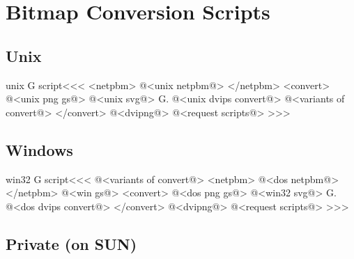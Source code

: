 \documentclass{article}
\begin{document}
\section{Bitmap Conversion Scripts}



\subsection{Unix}




\<unix G script\><<<
<netpbm>
@<unix netpbm@>
</netpbm>
<convert>
@<unix png gs@>
@<unix svg@>
G.
@<unix dvips convert@>
@<variants of convert@>
</convert>    
@<dvipng@>
@<request scripts@> %
>>>


\subsection{Windows}



\<win32 G script\><<<
@<variants of convert@>
<netpbm>
@<dos netpbm@>
</netpbm>
@<win gs@>
<convert>
@<dos png gs@>
@<win32 svg@>
G.
@<dos dvips convert@>
</convert>
@<dvipng@>
@<request scripts@> %
>>>


\subsection{Private (on SUN)}
\end{document}
